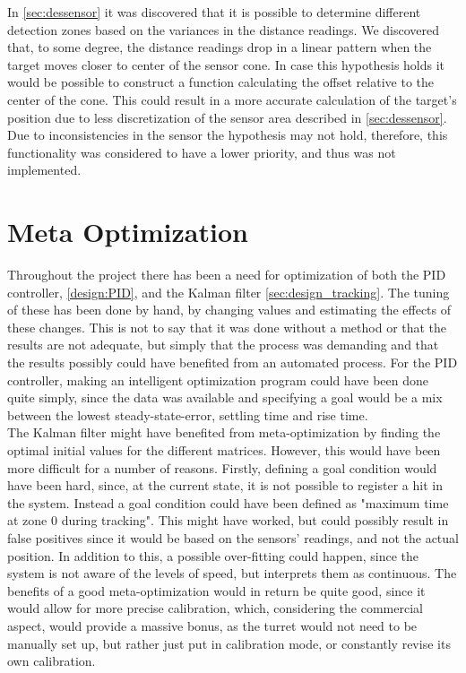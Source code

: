 In \cref{sec:dessensor} it was discovered that it is possible to determine different detection zones based on the variances in the distance readings. We discovered that, to some degree, the distance readings drop in a linear pattern when the target moves closer to center of the sensor cone. In case this hypothesis holds it would be possible to construct a function calculating the offset relative to the center of the cone. This could result in a more accurate calculation of the target's position due to less discretization of the sensor area described in \cref{sec:dessensor}. Due to inconsistencies in the sensor the hypothesis may not hold, therefore, this functionality was considered to have a lower priority, and thus was not implemented. 

\section{Meta Optimization}
Throughout the project there has been a need for optimization of both the PID controller, \cref{design:PID}, and the Kalman filter \cref{sec:design_tracking}. The tuning of these has been done by hand, by changing values and estimating the effects of these changes. This is not to say that it was done without a method or that the results are not adequate, but simply that the process was demanding and that the results possibly could have benefited from an automated process. For the PID controller, making an intelligent optimization program could have been done quite simply, since the data was available and specifying a goal would be a mix between the lowest steady-state-error, settling time and rise time. \\

The Kalman filter might have benefited from meta-optimization by finding the optimal initial values for the different matrices. However, this would have been more difficult for a number of reasons. Firstly, defining a goal condition would have been hard, since, at the current state, it is not possible to register a hit in the system. Instead a goal condition could have been defined as "maximum time at zone 0 during tracking". This might have worked, but could possibly result in false positives since it would be based on the sensors' readings, and not the actual position. In addition to this, a possible over-fitting could happen, since the system is not aware of the levels of speed, but interprets them as continuous. The benefits of a good meta-optimization would in return be quite good, since it would allow for more precise calibration, which, considering the commercial aspect, would provide a massive bonus, as the turret would not need to be manually set up, but rather just put in calibration mode, or constantly revise its own calibration.

